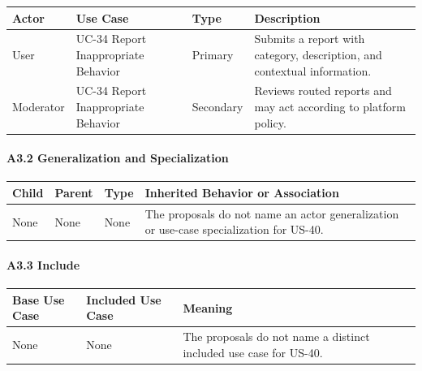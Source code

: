 \documentclass[12pt]{article}
\renewcommand{\baselinestretch}{1.5}
\begin{document}
\begingroup
\small
\renewcommand{\baselinestretch}{1.0}\selectfont
\renewcommand{\arraystretch}{1.15}
\setlength{\tabcolsep}{6pt}
\begin{longtable}{|>{\raggedright\arraybackslash}p{}|>{\raggedright\arraybackslash}p{}|>{\raggedright\arraybackslash}p{}|>{\raggedright\arraybackslash}p{}|}
\hline
\textbf{Actor} & \textbf{Use Case} & \textbf{Type} & \textbf{Description} \\ \hline
\endhead
User & UC-34 Report Inappropriate Behavior & Primary & Submits a report with category, description, and contextual information. \\ \hline
Moderator & UC-34 Report Inappropriate Behavior & Secondary & Reviews routed reports and may act according to platform policy. \\ \hline
\end{longtable}
\endgroup
\par\medskip

\hypertarget{sec:a3-2-generalization-and-specialization}{}
\paragraph*{A3.2 Generalization and Specialization}
\par\medskip

\begingroup
\small
\renewcommand{\baselinestretch}{1.0}\selectfont
\renewcommand{\arraystretch}{1.15}
\setlength{\tabcolsep}{6pt}
\begin{longtable}{|>{\raggedright\arraybackslash}p{}|>{\raggedright\arraybackslash}p{}|>{\raggedright\arraybackslash}p{}|>{\raggedright\arraybackslash}p{}|}
\hline
\textbf{Child} & \textbf{Parent} & \textbf{Type} & \textbf{Inherited Behavior or Association} \\ \hline
\endhead
None & None & None & The proposals do not name an actor generalization or use-case specialization for US-40. \\ \hline
\end{longtable}
\endgroup
\par\medskip

\hypertarget{sec:a3-3-include}{}
\paragraph*{A3.3 Include}
\par\medskip

\begingroup
\small
\renewcommand{\baselinestretch}{1.0}\selectfont
\renewcommand{\arraystretch}{1.15}
\setlength{\tabcolsep}{6pt}
\begin{longtable}{|>{\raggedright\arraybackslash}p{}|>{\raggedright\arraybackslash}p{}|>{\raggedright\arraybackslash}p{}|}
\hline
\textbf{Base Use Case} & \textbf{Included Use Case} & \textbf{Meaning} \\ \hline
\endhead
None & None & The proposals do not name a distinct included use case for US-40. \\ \hline
\end{longtable}
\endgroup
\par\medskip
\end{document}
